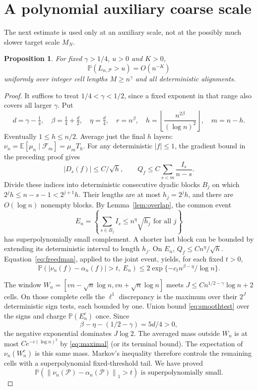 \documentclass[11pt]{article}
\newtheorem{proposition}[theorem]{Proposition}
\newcommand{\EE}{\mathbb E}
\newcommand{\PP}{\mathbb P}
\newcommand{\cF}{\mathcal F}
\newcommand{\cP}{\mathcal P}
\newcommand{\norm}[1]{\left\lVert#1\right\rVert_1}
\begin{document}
\section{A polynomial auxiliary coarse scale}

The next estimate is used only at an auxiliary scale, not at the
possibly much slower target scale $M_N$.

\begin{proposition}\label{prop:coarse}
For fixed $\gamma>1/4$, $u>0$ and $K>0$,
\[
 \PP(L_{n,\cP}>u)=O(n^{-K})
\]
uniformly over integer cell lengths $M\geq n^\gamma$
and all deterministic alignments.
\end{proposition}

\begin{proof}
It suffices to treat $1/4<\gamma<1/2$, since a fixed exponent in
that range also covers all larger $\gamma$.
Put
\[
 d=\gamma-\tfrac14,\quad
 \beta=\tfrac14+\tfrac d2,\quad \eta=\tfrac d4,\quad
 r=n^\beta,\quad h=\left\lfloor\frac{n^{2\beta}}{(\log n)^2}\right\rfloor,
 \quad m=n-h.
\]
Eventually $1\leq h\leq n/2$. Average just the final $h$ layers:
$\nu_n=\EE[\mu_n\mid\cF_m]=\mu_mT_h$.
For any deterministic $|f|\leq1$, the gradient bound in the preceding
proof gives
\[
 |D_s(f)|\leq C/\sqrt h,\qquad
 Q_f\leq C\sum_{s<m}\frac{I_s}{n-s}.
\]
Divide these indices into deterministic consecutive dyadic blocks
$B_j$ on which
$2^jh\leq n-s-1<2^{j+1}h$.
Their lengths are at most $h_j=2^jh$, and there are $O(\log n)$
nonempty blocks. By Lemma~\ref{lem:overlap}, the common event
\[
 E_n=\left\{\sum_{s\in B_j}I_s\leq n^\eta\sqrt{h_j}
                         \text{ for all }j\right\}
\]
has superpolynomially small complement. A shorter last block can
be bounded by extending its deterministic interval to length $h_j$.
On $E_n$, $Q_f\leq Cn^\eta/\sqrt h$.
Equation~\eqref{eq:freedman}, applied to the joint event, yields,
for each fixed $t>0$,
\begin{equation}\label{eq:smoothtest}
 \PP(|\nu_n(f)-\alpha_n(f)|>t,\ E_n)
       \leq2\exp\{-c_t n^{\beta-\eta}/\log n\}.
\end{equation}

The window $W_n=[vn-\sqrt n\log n,vn+\sqrt n\log n]$ meets
$J\leq Cn^{1/2-\gamma}\log n+2$ cells. On those complete cells the
$\ell^1$ discrepancy is the maximum over their $2^J$ deterministic
sign tests, each bounded by one. Union bound \eqref{eq:smoothtest}
over the signs and charge $\PP(E_n^c)$ once.
Since
\[
       \beta-\eta-(1/2-\gamma)=5d/4>0,
\]
the negative exponential dominates $J\log2$.
The averaged mass outside $W_n$ is at most
$Ce^{-c(\log n)^2}$ by \eqref{eq:maximal} (or its terminal bound).
The expectation of $\nu_n(W_n^c)$ is this same mass.
Markov's inequality therefore controls the remaining cells with a
superpolynomial fixed-threshold tail. We have proved
\begin{equation}\label{eq:nusmooth}
       \PP(\norm{\nu_n(\cP)-\alpha_n(\cP)}>t)
                       \text{ is superpolynomially small}.
\end{equation}


\end{proof}
\end{document}
